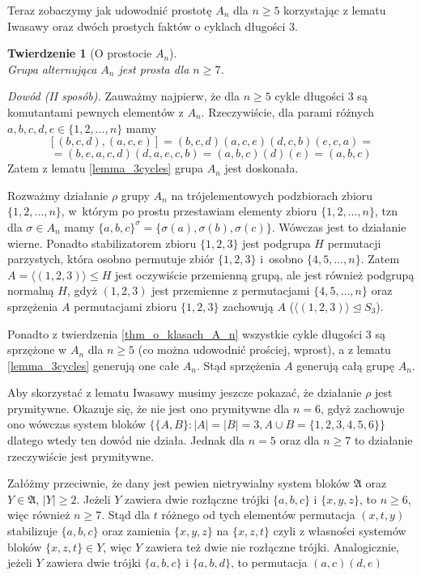 \documentclass[licencjacka]{pracamgr}
\newtheorem{thh}{Twierdzenie}[section]
\begin{document}
Teraz zobaczymy jak udowodnić prostotę $A_n$ dla $n \ge 5$ korzystając z lematu Iwasawy 
oraz dwóch prostych faktów o cyklach długości 3.

\addtocounter{chapter}{-2}
\begin{thh}[O prostocie $A_n$] $ $ \\
    Grupa alternująca $A_n$ jest prosta dla $n \ge 7$.
\end{thh}
\begin{proof}[Dowód (II sposób)]
  Zauważmy najpierw, że dla $n \ge 5$ cykle długości 3 są komutantami pewnych elementów z $A_n$.
  Rzeczywiście, dla parami różnych $a, b, c, d, e \in \{ 1, 2, \ldots, n \}$ mamy
  $$ [(b, c, d),(a, c, e)] = (b, c, d)(a, c, e)(d, c, b)(e, c, a) = $$
  $$ = (b, e, a, c, d)(d, a, e, c, b) = (a, b, c)(d)(e) = (a, b, c)$$
  Zatem z lematu \ref{lemma_3cycles} grupa $A_n$ jest doskonała.

  Rozważmy działanie $\rho$ grupy $A_n$ na trójelementowych podzbiorach zbioru $\{ 1, 2, \ldots, n \}$,
  w~którym po prostu przestawiam elementy zbioru $\{1, 2, \ldots, n\}$, 
  tzn dla $\sigma \in A_n$ mamy $\{a, b, c \}^\sigma = \{ \sigma(a), \sigma(b), \sigma(c) \}$.
  Wówczas jest to działanie wierne.
  Ponadto stabilizatorem zbioru $\{1, 2, 3\}$ jest podgrupa $H$ permutacji parzystych, 
  która osobno permutuje zbiór $\{1, 2, 3\}$ i~osobno $\{4, 5, \ldots, n\}$.
  Zatem $A =  \langle (1, 2, 3)  \rangle \le H$ jest oczywiście przemienną grupą,
  ale jest również podgrupą normalną $H$, gdyż $(1, 2, 3)$ jest przemienne z permutacjami $\{4, 5, \ldots, n\}$
  oraz sprzężenia $A$ permutacjami zbioru $\{1, 2, 3\}$ zachowują $A$ ($\langle (1, 2, 3)  \rangle \unlhd S_3$).
  
  Ponadto z twierdzenia \ref{thm_o_klasach_A_n} wszystkie cykle długości 3 są sprzężone w $A_n$ dla $n \ge 5$
  (co można udowodnić prościej, wprost), a z lematu \ref{lemma_3cycles} generują one całe $A_n$.
  Stąd sprzężenia $A$ generują całą grupę $A_n$.

  Aby skorzystać z lematu Iwasawy musimy jeszcze pokazać, że działanie $\rho$ jest prymitywne.
  Okazuje się, że nie jest ono prymitywne dla $n = 6$, gdyż zachowuje ono wówczas system bloków
  $\{\{A, B\} \colon |A| = |B| = 3, A \cup B = \{1, 2, 3, 4, 5, 6 \} \}$ dlatego wtedy ten dowód nie działa.
  Jednak dla $n = 5$ oraz dla $n \ge 7$ to działanie rzeczywiście jest prymitywne.

  Załóżmy przeciwnie, że dany jest pewien nietrywialny system bloków $\mathfrak{A}$ oraz
  $Y \in \mathfrak{A}$, $|Y| \ge 2$.
  Jeżeli $Y$ zawiera dwie rozłączne trójki $\{a, b, c\}$ i $\{x, y, z\}$, to $n \ge 6$, więc również $n \ge 7$.
  Stąd dla $t$ różnego od tych elementów permutacja $(x, t, y)$ stabilizuje $\{a, b, c\}$ oraz 
  zamienia $\{x, y, z\}$ na $\{x, z, t\}$ czyli z własności systemów bloków
  $\{x, z, t\} \in Y$, więc $Y$ zawiera też dwie nie rozłączne trójki.
  Analogicznie, jeżeli $Y$ zawiera dwie trójki $\{a, b, c\}$ i $\{a, b, d\}$, 
  to permutacja $(a, c)(d, e)$ wymusza, że również $\{b, c, e\} \in Y$, czyli $Y$ zawiera dwie trójki o~jednoelementowej części wspólnej.


\end{proof}
\end{document}
